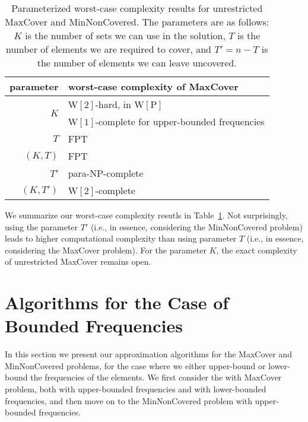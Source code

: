 \documentclass[11pt]{article}
\newcommand{\np}{{\mathrm{NP}}}
\newcommand{\wone}{{\mathrm{W[1]}}}
\newcommand{\wtwo}{{\mathrm{W[2]}}}
\newcommand{\wpclass}{{\mathrm{W[P]}}}
\begin{document}
\begin{table}
  \begin{center}
    \begin{tabular}{r|l}
      parameter  & {worst-case complexity of MaxCover} \\
      \hline
      \multirow{2}{*}{$K$}      & {$\wtwo$-hard, in $\wpclass$}\\
               &  $\wone$-complete for upper-bounded frequencies\\
      \rule{0cm}{5.5mm} 
      $T$      & FPT~\cite{bla:j:partial-set-cover} \\
      $(K,T)$  & FPT~\cite{bla:j:partial-set-cover} \\
      \rule{0cm}{5.5mm} 
      $T'$     & para-$\np$-complete \\
      $(K,T')$ & $\wtwo$-complete   \\
  \end{tabular}
  \caption{\label{tab:complexity}Parameterized worst-case complexity
    results for unrestricted MaxCover and MinNonCovered. The
    parameters are as follows: $K$ is the number of sets we can use in
    the solution, $T$ is the number of elements we are required to
    cover, and $T' = n-T$ is the number of elements we can leave
    uncovered.}
  \end{center}
\end{table}


We summarize our worst-case complexity resutls in
Table~\ref{tab:complexity}. Not surprisingly, using the parameter $T'$
(i.e., in essence, considering the MinNonCovered problem) leads to
higher computational complexity than using parameter $T$ (i.e., in
essence, considering the MaxCover problem). For the parameter $K$, the
exact complexity of unrestricted MaxCover remains open.




\section{Algorithms for the Case of Bounded Frequencies}\label{sec:approximation}

In this section we present our approximation algorithms for the
MaxCover and MinNonCovered problems, for the case where we either
upper-bound or lower-bound the frequencies of the elements. We first
consider the with MaxCover problem, both with upper-bounded
frequencies and with lower-bounded frequencies, and then move on to
the MinNonCovered problem with upper-bounded frequencies.
\end{document}
